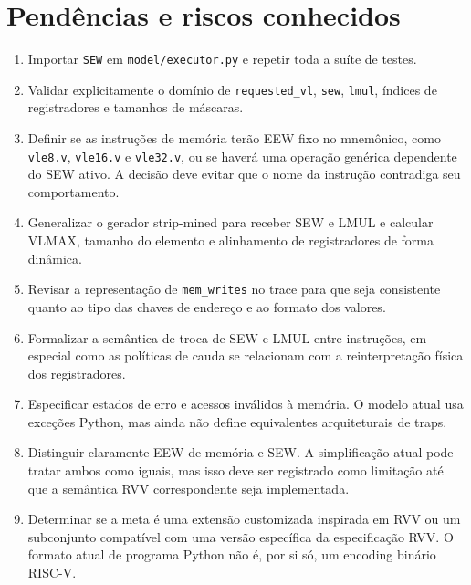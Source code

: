 
\section{Pendências e riscos conhecidos}

\begin{enumerate}
    \item Importar \texttt{SEW} em \texttt{model/executor.py} e repetir
    toda a suíte de testes.

    \item Validar explicitamente o domínio de \texttt{requested\_vl},
    \texttt{sew}, \texttt{lmul}, índices de registradores e tamanhos de
    máscaras.

    \item Definir se as instruções de memória terão EEW fixo no mnemônico,
    como \texttt{vle8.v}, \texttt{vle16.v} e \texttt{vle32.v}, ou se
    haverá uma operação genérica dependente do SEW ativo. A decisão deve
    evitar que o nome da instrução contradiga seu comportamento.

    \item Generalizar o gerador strip-mined para receber SEW e LMUL e
    calcular VLMAX, tamanho do elemento e alinhamento de registradores
    de forma dinâmica.

    \item Revisar a representação de \texttt{mem\_writes} no trace para
    que seja consistente quanto ao tipo das chaves de endereço e ao
    formato dos valores.

    \item Formalizar a semântica de troca de SEW e LMUL entre instruções,
    em especial como as políticas de cauda se relacionam com a
    reinterpretação física dos registradores.

    \item Especificar estados de erro e acessos inválidos à memória.
    O modelo atual usa exceções Python, mas ainda não define equivalentes
    arquiteturais de traps.

    \item Distinguir claramente EEW de memória e SEW. A simplificação
    atual pode tratar ambos como iguais, mas isso deve ser registrado
    como limitação até que a semântica RVV correspondente seja
    implementada.

    \item Determinar se a meta é uma extensão customizada inspirada em
    RVV ou um subconjunto compatível com uma versão específica da
    especificação RVV. O formato atual de programa Python não é, por si
    só, um encoding binário RISC-V.
\end{enumerate}

